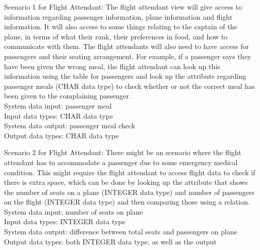 \documentclass[10pt,conference]{IEEEtran}
\begin{document}
\vspace{5mm}
Scenario 1 for Flight Attendant:
The flight attendant view will give access to information regarding passenger information, plane information and flight information. It will also access to some things relating to the captain of the plane, in terms of what their rank, their preferences in food, and how to communicate with them. 
The flight attendants will also need to have access for passengers and their seating arrangement. For example, if a passenger says they have been given the wrong meal, the flight attendant can look up this information using the table for passengers and look up the attribute regarding passenger meals (CHAR data type) to check whether or not the correct meal has been given to the complaining passenger. \vspace{5mm}\\System data input: passenger meal
\\
Input data types: CHAR data type\\
System data output: passenger meal check\\
Output data types: CHAR data type




\vspace{5mm}
Scenario 2 for Flight Attendant:
There might be an scenario where the flight attendant has to accommodate a passenger due to some emergency medical condition. This might require the flight attendant to access flight data to check if there is extra space, which can be done by looking up the attribute that shows the number of seats on a plane (INTEGER data type) and number of passengers on the flight (INTEGER data type) and then comparing those using a relation. \vspace{5mm}\\System data input: number of seats on plane
\\
Input data types: INTEGER data type\\
System data output: difference between total seats and passengers on plane 
\\
Output data types: both INTEGER data type, as well as the output
\end{document}
